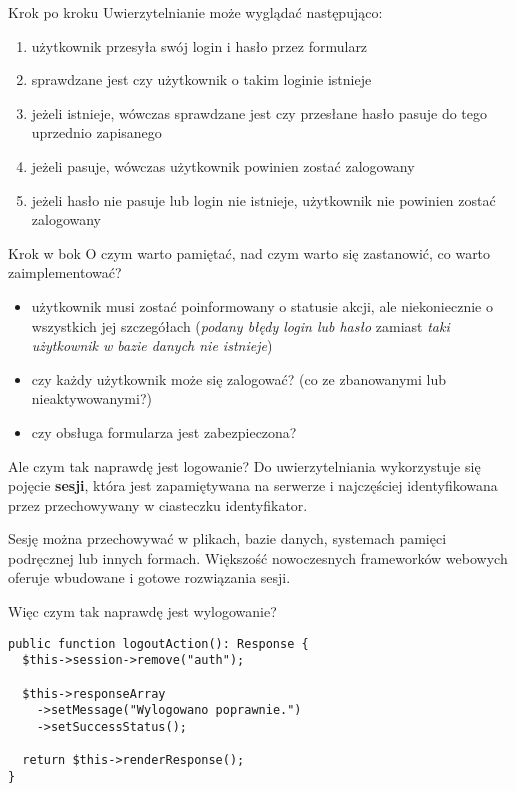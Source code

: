 \begin{frame}{Krok po kroku}
	Uwierzytelnianie może wyglądać następująco:
	\begin{enumerate}
		\item użytkownik przesyła swój login i hasło przez formularz
		\item sprawdzane jest czy użytkownik o takim loginie istnieje
		\item jeżeli istnieje, wówczas sprawdzane jest czy przesłane hasło pasuje do tego uprzednio zapisanego
		\item jeżeli pasuje, wówczas użytkownik powinien zostać zalogowany
		\item jeżeli hasło nie pasuje lub login nie istnieje, użytkownik nie powinien zostać zalogowany
	\end{enumerate}
\end{frame}

\begin{frame}{Krok w bok}
	O czym warto pamiętać, nad czym warto się zastanowić, co warto zaimplementować?
	\begin{itemize}
		\item użytkownik musi zostać poinformowany o statusie akcji, ale niekoniecznie o wszystkich jej szczegółach (\emph{podany błędy login lub hasło} zamiast \emph{taki użytkownik w bazie danych nie istnieje})
		\item czy każdy użytkownik może się zalogować? (co ze zbanowanymi lub nieaktywowanymi?)
		\item czy obsługa formularza jest zabezpieczona?
	\end{itemize}
\end{frame}

\begin{frame}{Ale czym tak naprawdę jest logowanie?}
	Do uwierzytelniania wykorzystuje się pojęcie \textbf{sesji}, która jest zapamiętywana na serwerze i najczęściej identyfikowana przez przechowywany w ciasteczku identyfikator.
	
	Sesję można przechowywać w plikach, bazie danych, systemach pamięci podręcznej lub innych formach. Większość nowoczesnych frameworków webowych oferuje wbudowane i gotowe rozwiązania sesji.
\end{frame}

\begin{frame}[fragile]{Więc czym tak naprawdę jest wylogowanie?}
	\begin{lstlisting}
public function logoutAction(): Response {
  $this->session->remove("auth");

  $this->responseArray
    ->setMessage("Wylogowano poprawnie.")
    ->setSuccessStatus();

  return $this->renderResponse();
}
	\end{lstlisting}
\end{frame}

